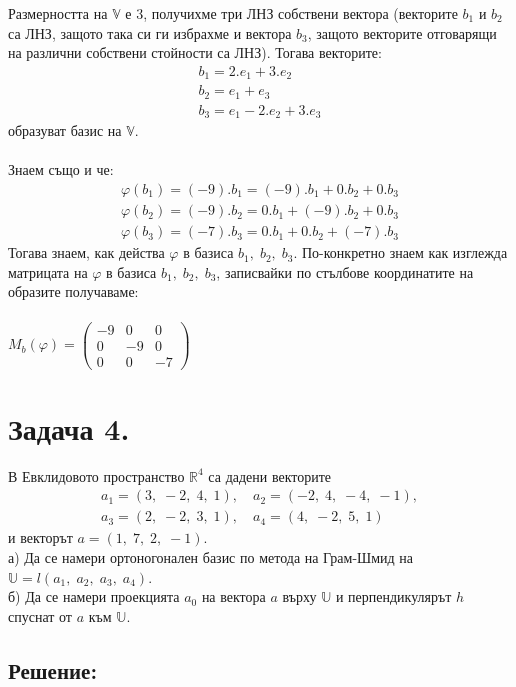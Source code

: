 \documentclass[a4paper, 12pt]{article}
\begin{document}
    Размерността на $\mathbb{V}$ е 3, получихме три ЛНЗ собствени вектора
    (векторите $b_1$ и $b_2$ са ЛНЗ, защото така си ги избрахме и вектора $b_3$,
    защото векторите отговарящи на различни собствени стойности са ЛНЗ).
    Тогава векторите:
    \begin{align*}
        b_1 = 2.e_1 + 3.e_2 \\
        b_2 = e_1 + e_3 \\
        b_3 = e_1 - 2.e_2 + 3.e_3
    \end{align*}
    образуват базис на $\mathbb{V}$. \\\\
    Знаем също и че:
    \begin{align*}
        \varphi(b_1) = (-9).b_1 = (-9).b_1 + 0.b_2 + 0.b_3 \\
        \varphi(b_2) = (-9).b_2 = 0.b_1 + (-9).b_2 + 0.b_3 \\
        \varphi(b_3) = (-7).b_3 = 0.b_1 + 0.b_2 + (-7).b_3
    \end{align*}
    Тогава знаем, как действа $\varphi$ в базиса $b_1, \; b_2, \; b_3$.
    По-конкретно знаем как изглежда матрицата на $\varphi$ в базиса $b_1, \; b_2, \; b_3$,
    записвайки по стълбове координатите на образите получаваме: \\\\
    $M_b(\varphi) = \begin{pmatrix}
        -9 & 0 & 0\\
        0 & -9 & 0\\
        0 & 0 & -7
    \end{pmatrix}$
    \section*{Задача 4.}
    В Евклидовото пространство $\mathbb{R}^4$ са дадени векторите
    \begin{align*}
        a_1 = (3, \; -2, \; 4, \; 1), \quad a_2 = (-2, \; 4, \; -4, \; -1),\\
        a_3 = (2, \; -2, \; 3, \; 1), \quad a_4 = (4, \; -2, \; 5, \; 1)
    \end{align*}
    и векторът $a = (1, \; 7, \; 2, \; -1)$.\\
    а) Да се намери ортоногонален базис по метода
    на Грам-Шмид на $\mathbb{U} = l(a_1, \; a_2, \; a_3, \; a_4)$. \\
    б) Да се намери проекцията $a_0$ на вектора $a$ върху $\mathbb{U}$
    и перпендикулярът $h$ спуснат от $a$ към $\mathbb{U}$.
    \subsection*{Решение:}
\end{document}
